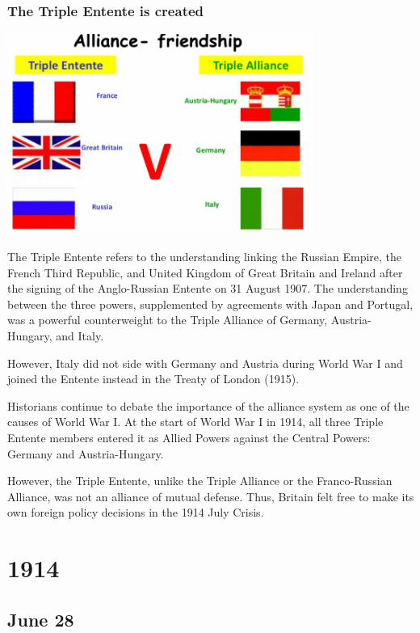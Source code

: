 \documentclass[11pt]{report}
\begin{document}
\subsection{The Triple Entente is created}
\vspace{2mm}\begin{center}\includegraphics[width=10cm]{./img/tripleEntente.png}\end{center}
The Triple Entente refers to the understanding linking the Russian Empire, the French Third Republic, and United Kingdom of Great Britain and Ireland after the signing of the Anglo-Russian Entente on 31 August 1907. The understanding between the three powers, supplemented by agreements with Japan and Portugal, was a powerful counterweight to the Triple Alliance of Germany, Austria-Hungary, and Italy.

However, Italy did not side with Germany and Austria during World War I and joined the Entente instead in the Treaty of London (1915).

Historians continue to debate the importance of the alliance system as one of the causes of World War I. At the start of World War I in 1914, all three Triple Entente members entered it as Allied Powers against the Central Powers: Germany and Austria-Hungary.

However, the Triple Entente, unlike the Triple Alliance or the Franco-Russian Alliance, was not an alliance of mutual defense. Thus, Britain felt free to make its own foreign policy decisions in the 1914 July Crisis.

\chapter{1914}
\section{June 28}
\end{document}
